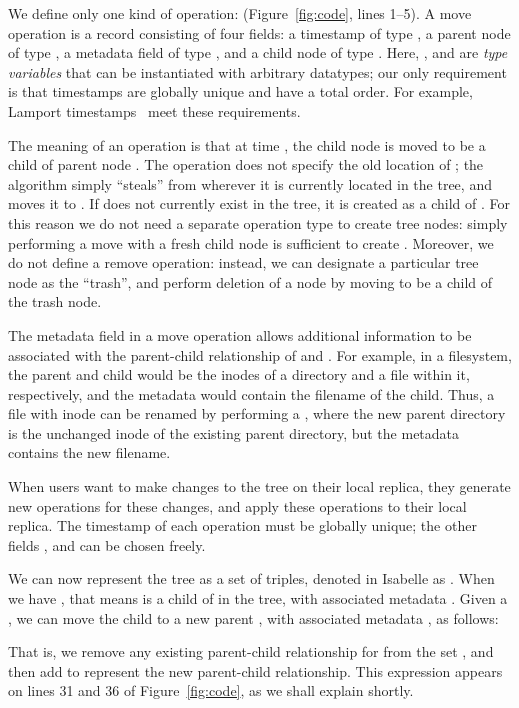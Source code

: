 \documentclass[sigconf]{acmart}
\begin{document}
We define only one kind of operation:  (Figure~\ref{fig:code}, lines 1--5).
A move operation is a record consisting of four fields: a timestamp  of type , a parent node  of type , a metadata field  of type , and a child node  of type .
Here, ,  and  are \emph{type variables} that can be instantiated with arbitrary datatypes; our only requirement is that timestamps  are globally unique and have a total order.
For example, Lamport timestamps~\cite{Lamport:1978jq} meet these requirements.

The meaning of an operation  is that at time , the child node  is moved to be a child of parent node .
The operation does not specify the old location of ; the algorithm simply ``steals''  from wherever it is currently located in the tree, and moves it to .
If  does not currently exist in the tree, it is created as a child of .
For this reason we do not need a separate operation type to create tree nodes: simply performing a move with a fresh child node  is sufficient to create .
Moreover, we do not define a remove operation: instead, we can designate a particular tree node as the ``trash'', and perform deletion of a node  by moving  to be a child of the trash node.

The metadata field  in a move operation allows additional information to be associated with the parent-child relationship of  and .
For example, in a filesystem, the parent and child would be the inodes of a directory and a file within it, respectively, and the metadata would contain the filename of the child.
Thus, a file with inode  can be renamed by performing a , where the new parent directory  is the unchanged inode of the existing parent directory, but the metadata  contains the new filename.

When users want to make changes to the tree on their local replica, they generate new  operations for these changes, and apply these operations to their local replica.
The timestamp  of each operation must be globally unique; the other fields ,  and  can be chosen freely.

We can now represent the tree as a set of  triples, denoted in Isabelle as .
When we have , that means  is a child of  in the tree, with associated metadata .
Given a , we can move the child  to a new parent , with associated metadata , as follows:
\begin{quote}
\end{quote}
That is, we remove any existing parent-child relationship for  from the set , and then add  to represent the new parent-child relationship.
This expression appears on lines 31 and 36 of Figure~\ref{fig:code}, as we shall explain shortly.
\end{document}
